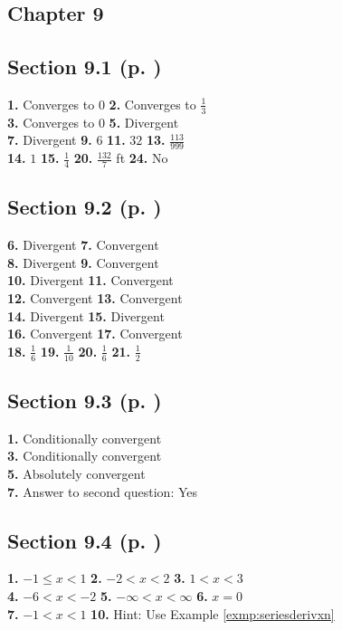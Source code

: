 \begin{multicols*}{2}
\section*{Chapter 9}
\subsection*{Section 9.1 (p. \pageref{sec9dot1})}
\textbf{1.} Converges to $0$ \quad
\textbf{2.} Converges to $\frac{1}{3}$\\
\textbf{3.} Converges to $0$ \quad
\textbf{5.} Divergent\\
\textbf{7.} Divergent \quad
\textbf{9.} $6$ \quad
\textbf{11.} $32$ \quad
\textbf{13.} $\frac{113}{999}$\\
\textbf{14.} $1$ \quad
\textbf{15.} $\frac{1}{4}$ \quad
\textbf{20.} $\frac{132}{7}$ ft \quad
\textbf{24.} No
\subsection*{Section 9.2 (p. \pageref{sec9dot2})}
\textbf{6.} Divergent \quad
\textbf{7.} Convergent\\
\textbf{8.} Divergent \quad
\textbf{9.} Convergent\\
\textbf{10.} Divergent \quad
\textbf{11.} Convergent\\
\textbf{12.} Convergent \quad
\textbf{13.} Convergent\\
\textbf{14.} Divergent \quad
\textbf{15.} Divergent\\
\textbf{16.} Convergent \quad
\textbf{17.} Convergent\\
\textbf{18.} $\frac{1}{6}$ \quad
\textbf{19.} $\frac{1}{10}$ \quad
\textbf{20.} $\frac{1}{6}$ \quad
\textbf{21.} $\frac{1}{2}$
\subsection*{Section 9.3 (p. \pageref{sec9dot3})}
\textbf{1.} Conditionally convergent\\
\textbf{3.} Conditionally convergent\\
\textbf{5.} Absolutely convergent\\
\textbf{7.} Answer to second question: Yes
\subsection*{Section 9.4 (p. \pageref{sec9dot4})}
\textbf{1.} $-1\le x<1$ \quad
\textbf{2.} $-2<x<2$ \quad
\textbf{3.} $1<x<3$\\
\textbf{4.} $-6<x<-2$ \quad
\textbf{5.} $-\infty<x<\infty$ \quad
\textbf{6.} $x=0$\\
\textbf{7.} $-1<x<1$ \quad
\textbf{10.} Hint: Use Example \ref{exmp:seriesderivxn}

\end{multicols*}
